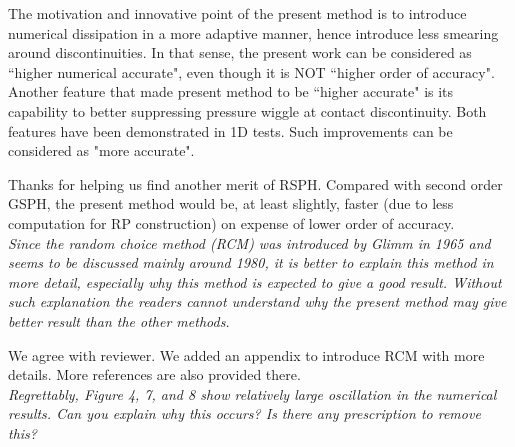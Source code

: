 \documentclass[10pt,a4paper]{article}
\begin{document}
The motivation and innovative point of the present method is to introduce numerical dissipation in a more adaptive manner, hence introduce less smearing around discontinuities. In that sense, the present work can be considered as ``higher numerical accurate", even though it is NOT ``higher order of accuracy". Another feature that made present method to be ``higher accurate" is its capability to better suppressing pressure wiggle at contact discontinuity. Both features have been demonstrated in 1D tests. Such improvements can be considered as "more accurate".
 
Thanks for helping us find another merit of RSPH. Compared with second order GSPH, the present method would be, at least slightly, faster (due to less computation for RP construction) on expense of lower order of accuracy. \\[3pt] 

\textit{Since the random choice method (RCM) was introduced by Glimm in 1965 and seems to be discussed mainly around 1980, it is better to explain this method in more detail, especially why this method is expected to give a good result. Without such explanation the readers cannot understand why the present method may give better result than the other methods.}

We agree with reviewer. We added an appendix to introduce RCM with more details. More references are also provided there.\\[3pt]

\textit{Regrettably, Figure 4, 7, and 8 show relatively large oscillation in the
numerical results. Can you explain why this occurs? Is there any prescription to remove this?}
\end{document}
